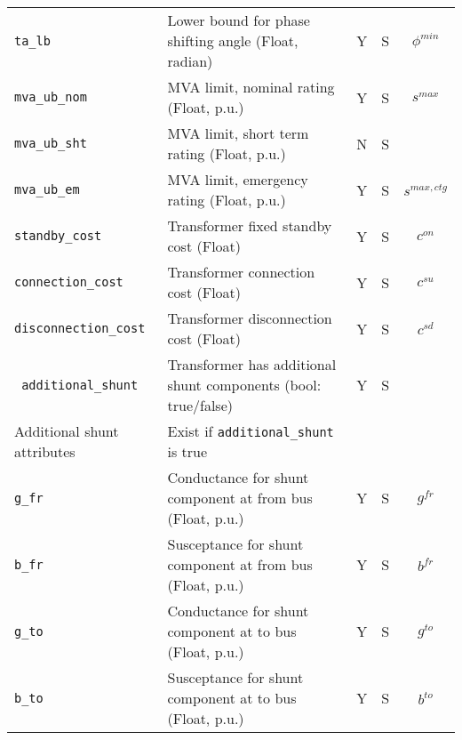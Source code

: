 \documentclass{article}
\begin{document}
\begin{center}
\begin{tabular}{ l | l | c | c | c |}
  {\tt ta\_lb} & Lower bound for phase shifting angle (Float, radian)& Y & S & $\phi^{min}$\\
  {\tt mva\_ub\_nom} & MVA limit, nominal rating (Float, p.u.) & Y & S & $s^{max}$ \\
  {\tt mva\_ub\_sht} & MVA limit, short term rating (Float, p.u.) & N & S &  \\
  {\tt mva\_ub\_em} & MVA limit, emergency rating (Float, p.u.) & Y & S & $s^{max,ctg}$ \\
 
  {\tt standby\_cost} & Transformer fixed standby cost (Float) & Y & S & $c^{on}$\\
  {\tt connection\_cost} &  Transformer connection cost (Float) & Y & S & $c^{su}$\\      
  {\tt disconnection\_cost} & Transformer disconnection cost (Float) & Y & S & $c^{sd}$\\  
  {\tt\color{red} additional\_shunt} & Transformer has additional shunt components (bool: true/false)& Y & S & \\
  \hline    
  Additional shunt attributes & Exist if {\tt additional\_shunt} is true &  & & \\
  \hline
  {\tt g\_fr} & Conductance for shunt component at from bus (Float, p.u.)& Y & S & $g^{fr}$\\
  {\tt b\_fr} & Susceptance for shunt component at from bus (Float, p.u.)& Y & S & $b^{fr}$\\
  {\tt g\_to} & Conductance for shunt component at to bus (Float, p.u.)& Y & S & $g^{to}$\\
  {\tt b\_to} & Susceptance for shunt component at to bus (Float, p.u.)& Y & S & $b^{to}$\\
  \hline
\end{tabular}
\end{center}
\end{document}
